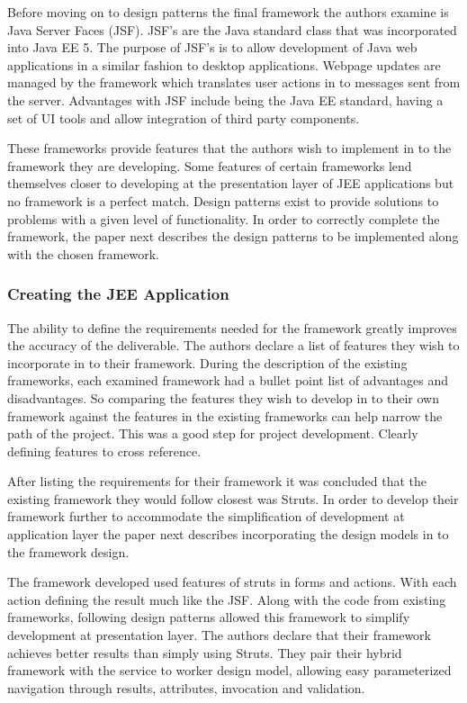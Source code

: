 									Before moving on to design patterns the final framework the authors examine is Java Server Faces (JSF). JSF’s are the Java standard class that was incorporated into Java EE 5. The purpose of JSF’s is to allow development of Java web applications in a similar fashion to desktop applications. Webpage updates are managed by the framework which translates user actions in to messages sent from the server. Advantages with JSF include being the Java EE standard, having a set of UI tools and allow integration of third party components.
									
									These frameworks provide features that the authors wish to implement in to the framework they are developing. Some features of certain frameworks lend themselves closer to developing at the presentation layer of JEE applications but no framework is a perfect match. Design patterns exist to provide solutions to problems with a given level of functionality\cite{designpatternshall}. In order to correctly complete the framework, the paper next describes the design patterns to be implemented along with the chosen framework. 
									
									\subsubsection{Creating the JEE Application}
									The ability to define the requirements needed for the framework greatly improves the accuracy of the deliverable. The authors declare a list of features they wish to incorporate in to their framework. During the description of the existing frameworks, each examined framework had a bullet point list of advantages and disadvantages. So comparing the features they wish to develop in to their own framework against the features in the existing frameworks can help narrow the path of the project. This was a good step for project development. Clearly defining features to cross reference.
									
									After listing the requirements for their framework it was concluded that the existing framework they would follow closest was Struts. In order to develop their framework further to accommodate the simplification of development at application layer the paper next describes incorporating the design models in to the framework design.
									
									The framework developed used features of struts in forms and actions. With each action defining the result much like the JSF. Along with the code from existing frameworks, following design patterns allowed this framework to simplify development at presentation layer. The authors declare that their framework achieves better results than simply using Struts. They pair their hybrid framework with the service to worker design model, allowing easy parameterized navigation through results, attributes, invocation and validation.
									
